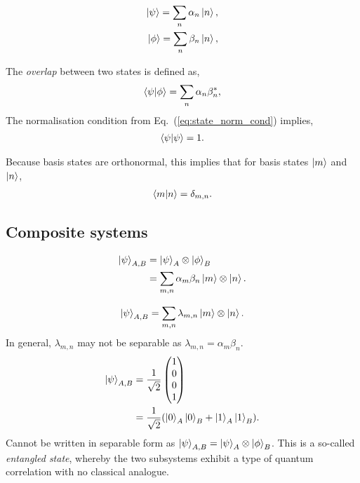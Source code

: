 \documentclass[aps,pra,twocolumn,amsmath,amssymb,nofootinbib,superscriptaddress]{revtex4}
\begin{document}
\begin{align}
	\ket\psi = \sum_n \alpha_n \ket{n},\nonumber\\
	\ket\phi = \sum_n \beta_n \ket{n},
\end{align}

The \textit{overlap} between two states is defined as,
\begin{align}
\braket{\psi|\phi} = \sum_n \alpha_n\beta_n^*,
\end{align}
The normalisation condition from Eq.~(\ref{eq:state_norm_cond}) implies,
\begin{align}
\braket{\psi|\psi} = 1.	
\end{align}

Because basis states are orthonormal, this implies that for basis states $\ket{m}$ and $\ket{n}$,
\begin{align}
	\braket{m|n}=\delta_{m,n}.
\end{align}

%
%

\subsection{Composite systems}

\begin{align}
\ket\psi_{A,B} &= \ket\psi_A \otimes \ket\phi_B\nonumber\\
&=\sum_{m,n} \alpha_m\beta_n\ket{m}\otimes\ket{n}.
\end{align}

\begin{align}
\ket\psi_{A,B} =\sum_{m,n} \lambda_{m,n}\ket{m}\otimes\ket{n}.
\end{align}
In general, $\lambda_{m,n}$ may not be separable as \mbox{$\lambda_{m,n}=\alpha_m\beta_n$}.
\begin{align}
\ket\psi_{A,B} &= \frac{1}{\sqrt{2}}\left(\begin{matrix}{}
  1\\
  0\\
  0\\
  1
\end{matrix}\right)\nonumber\\
&= \frac{1}{\sqrt{2}}(\ket{0}_A\ket{0}_B+\ket{1}_A\ket{1}_B).
\end{align}
Cannot be written in separable form as \mbox{$\ket\psi_{A,B} = \ket\psi_A \otimes \ket\phi_B$}. This is a so-called \textit{entangled state}, whereby the two subsystems exhibit a type of quantum correlation with no classical analogue.
\end{document}
